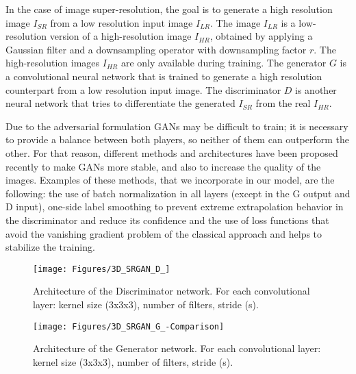 \documentclass{article}
\begin{document}
In the case of image super-resolution, the goal is to generate a high resolution image $I_{SR}$ from a low resolution input image $I_{LR}$. The image $I_{LR}$ is a low-resolution version of a high-resolution image $I_{HR}$, obtained by applying a Gaussian filter and a downsampling operator with downsampling factor $r$. The high-resolution images $I_{HR}$ are only available during training.
The generator $G$ is a convolutional neural network that is trained to generate a high resolution counterpart from a low resolution input image. The discriminator $D$ is another neural network that tries to differentiate the generated $I_{SR}$ from the real $I_{HR}$.

Due to the adversarial formulation GANs may be difficult to train; it is necessary to provide a balance between both players, so neither of them can outperform the other. 
For that reason, different methods and architectures have been proposed recently to make GANs more stable, and also to increase the quality of the images. 
Examples of these methods, that we incorporate in our model, are the following:
the use of batch normalization in all layers (except in the G output and D input), one-side label smoothing to prevent extreme extrapolation behavior in the discriminator and reduce its confidence and the use of loss functions that avoid the vanishing gradient problem of the classical approach and helps to stabilize the training.

\begin{figure*}
  \texttt{[image: Figures/3D\_SRGAN\_D\_]}
  \caption{Architecture of the Discriminator network. For each convolutional layer: kernel size (3x3x3), number of filters, stride (s).}
  \label{fig:D}
\end{figure*}
\begin{figure*}
   \texttt{[image: Figures/3D\_SRGAN\_G\_-Comparison]}
   \caption{Architecture of the Generator network. For each convolutional layer: kernel size (3x3x3), number of filters, stride (s).}
	\label{fig:G}
\end{figure*}
\end{document}
